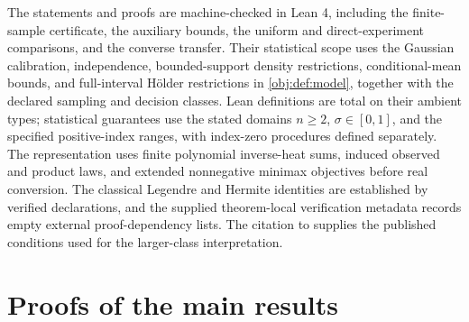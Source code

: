 \documentclass[11pt]{article}
\begin{document}
The statements and proofs are machine-checked in Lean 4, including the finite-sample certificate, the auxiliary bounds, the uniform and direct-experiment comparisons, and the converse transfer. Their statistical scope uses the Gaussian calibration, independence, bounded-support density restrictions, conditional-mean bounds, and full-interval Hölder restrictions in \cref{obj:def:model}, together with the declared sampling and decision classes. Lean definitions are total on their ambient types; statistical guarantees use the stated domains \(n\ge2\), \(\sigma\in[0,1]\), and the specified positive-index ranges, with index-zero procedures defined separately. The representation uses finite polynomial inverse-heat sums, induced observed and product laws, and extended nonnegative minimax objectives before real conversion. The classical Legendre and Hermite identities are established by verified declarations, and the supplied theorem-local verification metadata records empty external proof-dependency lists. The citation to \citet[Assumptions~1Y, 2C, and 7]{PeiShen2017DevilTails} supplies the published conditions used for the larger-class interpretation.


\section{Proofs of the main results}\label{sec:deferred-proofs}
\end{document}
